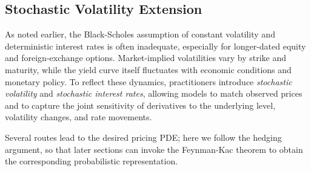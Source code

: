 \documentclass[12pt]{report} %
\theoremstyle{plain} %
\theoremstyle{definition} %
\theoremstyle{remark} %
\begin{document}
\subsection{Stochastic Volatility Extension}\label{sec:sv_extension}

As noted earlier, the Black-Scholes assumption of constant volatility
and deterministic interest rates is often inadequate, especially for longer-dated equity
and foreign-exchange options. Market-implied volatilities vary by strike and maturity,
while the yield curve itself fluctuates with economic conditions and monetary policy.
To reflect these dynamics, practitioners introduce \emph{stochastic volatility} and
\emph{stochastic interest rates}, allowing models to match observed prices and to capture
the joint sensitivity of derivatives to the underlying level, volatility changes,
and rate movements.

Several routes lead to the desired pricing PDE; here we follow the hedging argument,
so that later sections can invoke the Feynman-Kac theorem to obtain the corresponding
probabilistic representation.
\end{document}
